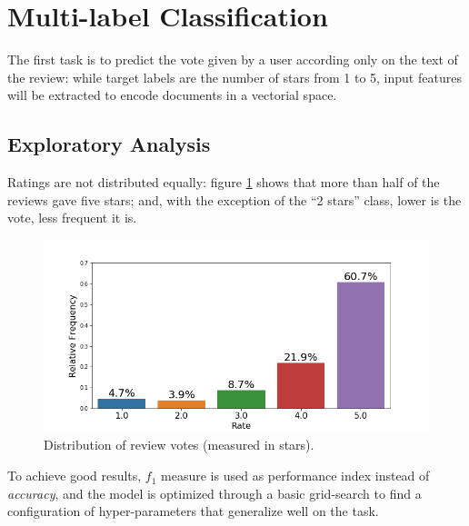 \documentclass[fleqn,10pt]{SelfArx}
\begin{document}
\section{Multi-label Classification}
The first task is to predict the vote given by a user according only on the text of the review: while target labels are the number of stars from 1 to 5, input features will be extracted to encode documents in a vectorial space.

\subsection{Exploratory Analysis}
Ratings are not distributed equally: figure \ref{fig:rate_dist} shows that more than half of the reviews gave five stars; and, with the exception of the ``2 stars'' class, lower is the vote, less frequent it is.
\begin{figure}[!h]
    \includegraphics[width=\linewidth]{rate_dist.png}
    \caption{Distribution of review votes (measured in stars).}
    \label{fig:rate_dist}
\end{figure}

To achieve good results, $f_1$ measure is used as performance index instead of \textit{accuracy}, and the model is optimized through a basic grid-search to find a configuration of hyper-parameters that generalize well on the task.
\end{document}
